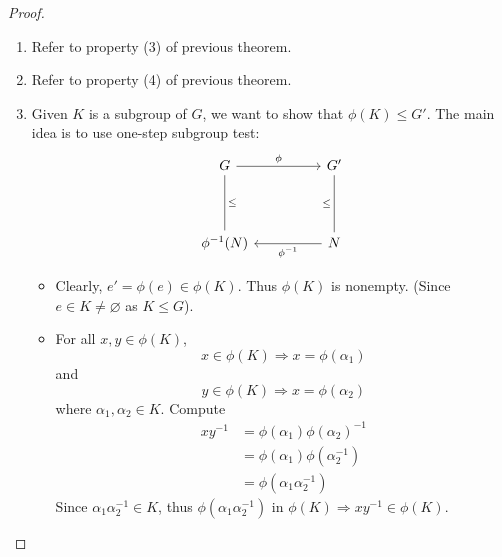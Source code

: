 \begin{proof}
\begin{enumerate}
        \item Refer to property (3) of previous theorem.
        \item Refer to property (4) of previous theorem.
        \item Given $K$ is a subgroup of $G$, we want to show that $\phi(K) \leq G'$. The main idea is to use one-step subgroup test:
        \[\begin{tikzcd}[row sep=2.0em]
            G \arrow["\phi"]{rr} \arrow[dash, "\leq"]{dd} & & G' \\
            \\
            \phi^{-1}(N)  & & N \arrow[dash, "\leq"]{uu} \arrow["\phi^{-1}"]{ll}
        \end{tikzcd}
        \]
        \begin{itemize}
            \item Clearly, $e' = \phi(e) \in \phi(K)$. Thus $\phi(K)$ is nonempty. (Since $e \in K \neq \varnothing$ as $K \leq G$).
            \item For all $x,y \in \phi(K)$, 
            \[
                x \in \phi(K) \Rightarrow x = \phi(\alpha_1)
            \]
            and 
            \[
                y \in \phi(K) \Rightarrow x = \phi(\alpha_2)
            \]
            where $\alpha_1, \alpha_2 \in K$. Compute 
            \begin{align*}
                xy^{-1} &= \phi(\alpha_1) \phi(\alpha_2)^{-1}\\
                &= \phi(\alpha_1) \phi(\alpha_2^{-1})\\
                &= \phi(\alpha_1 \alpha_2^{-1})
            \end{align*}
            Since $\alpha_1 \alpha_2^{-1} \in K$, thus $\phi(\alpha_1 \alpha_2^{-1})$ in $\phi(K) \Longrightarrow xy^{-1} \in \phi(K)$.

        \end{itemize}
    \end{enumerate}
\end{proof}

